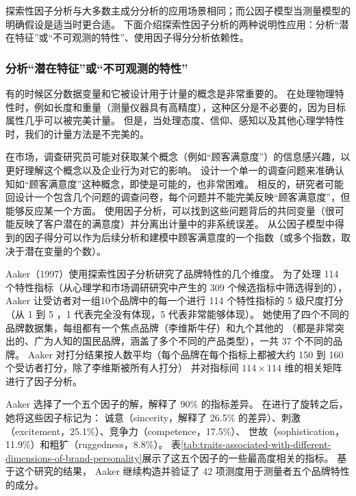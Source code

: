 探索性因子分析与大多数主成分分析的应用场景相同；而公因子模型当测量模型的明确假设是适当时更合适。
下面介绍探索性因子分析的两种说明性应用：分析“潜在特征”或“不可观测的特性”、使用因子得分分析依赖性。

\subsubsection{分析“潜在特征”或“不可观测的特性”}

有的时候区分数据变量和它被设计用于计量的概念是非常重要的。
在处理物理特性时，例如长度和重量（测量仪器具有高精度），这种区分是不必要的，因为目标属性几乎可以被完美计量。
但是，当处理态度、信仰、感知以及其他心理学特性时，我们的计量方法是不完美的。

在市场，调查研究员可能对获取某个概念（例如“顾客满意度”）的信息感兴趣，以更好理解这个概念以及企业行为对它的影响。
设计一个单一的调查问题来准确认知如“顾客满意度”这种概念，即使是可能的，也非常困难。
相反的，研究者可能回设计一个包含几个问题的调查问卷，每个问题并不能完美反映“顾客满意度”，但能够反应某一个方面。
使用因子分析，可以找到这些问题背后的共同变量（很可能反映了客户潜在的满意度）并分离出计量中的非系统误差。
从公因子模型中得到的因子得分可以作为后续分析和建模中顾客满意度的一个指数（或多个指数，取决于潜在变量的个数）。

Aaker（1997）使用探索性因子分析研究了品牌特性的几个维度。
为了处理 114 个特性指标（从心理学和市场调研研究中产生的 309 个候选指标中筛选得到的），
Aaker 让受访者对一组10个品牌中的每一个进行 114 个特性指标的 5 级尺度打分（从 1 到 5 ，1 代表完全没有体现，5 代表非常能够体现）。
她使用了四个不同的品牌数据集，每组都有一个焦点品牌（李维斯牛仔）和九个其他的
（都是非常突出的、广为人知的国民品牌，涵盖了多个不同的产品类型），一共 37 个不同的品牌。
Aaker 对打分结果按人数平均（每个品牌在每个指标上都被大约 150 到 160 个受访者打分，除了李维斯被所有人打分）
并对指标间 $ 114 \times 114 $ 维的相关矩阵进行了因子分析。

Aaker 选择了一个五个因子的解，解释了 90\% 的指标差异。
在进行了旋转之后，她将这些因子标记为：
诚意（sincerity，解释了 26.5\% 的差异）、刺激（excitement，25.1\%）、竞争力（competence，17.5\%）、
世故（sophistication，11.9\%）和粗犷（ruggedness，8.8\%）。
表\ref{tab:traits-associated-with-different-dimensions-of-brand-personality}展示了这五个因子的一些最高度相关的指标。
基于这个研究的结果， Aaker 继续构造并验证了 42 项测度用于测量者五个品牌特性的成分。


